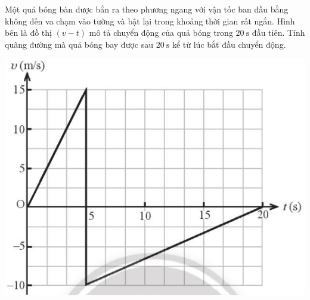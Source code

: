 \begin{ex}
	Một quả bóng bàn được bắn ra theo phương ngang với vận tốc ban đầu bằng không đến va chạm vào tường và bật lại trong khoảng thời gian rất ngắn. Hình bên là đồ thị $\left(v-t\right)$ mô tả chuyển động của quả bóng trong $\SI{20}{\second}$ đầu tiên. Tính quãng đường mà quả bóng bay được sau $\SI{20}{\second}$ kể từ lúc bắt đầu chuyển động.
	\begin{center}
		\includegraphics[scale=0.5]{figs/G10Y25B6-26}
	\end{center}
\end{ex}
